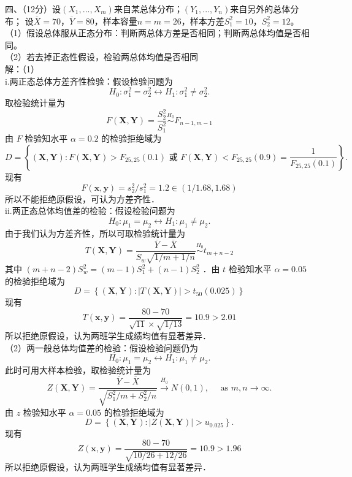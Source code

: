 \documentclass[UTF8,openany]{book}
\begin{document}
	\noindent 四、（12分）设$\left( X_1,...,X_m\right)$来自某总体分布；$\left( Y_1,...,Y_n\right)$来自另外的总体分布；
	设$\overline{X} = 70$，$\overline{Y} = 80$，样本容量$n = m = 26$，样本方差$S_1^2 = 10$，$S_2^2 = 12$。\\
	（1）假设总体服从正态分布：判断两总体方差是否相同；判断两总体均值是否相同。\\
	（2）若去掉正态性假设，检验两总体均值是否相同\\
	解：（1）\\
	i.两正态总体方差齐性检验：假设检验问题为
	$$
	H_0: \sigma_1^2=\sigma_2^2 \longleftrightarrow H_1: \sigma_1^2 \neq \sigma_2^2 .
	$$
	取检验统计量为
	$$
	F(\boldsymbol{X}, \boldsymbol{Y})=\frac{S_2^2}{S_1^2} \stackrel{H_0}{\sim} F_{n-1, m-1}
	$$
	由 $F$ 检验知水平 $\alpha=0.2$ 的检验拒绝域为
	$$
	D=\left\{(\boldsymbol{X}, \boldsymbol{Y}): F(\boldsymbol{X}, \boldsymbol{Y})>F_{25,25}(0.1) \text { 或 } F(\boldsymbol{X}, \boldsymbol{Y})<F_{25,25}(0.9)=\frac{1}{F_{25,25}(0.1)}\right\} \text {. }
	$$
	现有 
	$$F(\boldsymbol{x}, \boldsymbol{y})=s_2^2 / s_1^2=1.2 \in(1 / 1.68,1.68)$$
	所以不能拒绝原假设，可认为方差齐性．\\
	ii.两正态总体均值差的检验：假设检验问题为
	$$
	H_0: \mu_1=\mu_2 \longleftrightarrow H_1: \mu_1 \neq \mu_2 .
	$$
	由于我们认为方差齐性，所以可取检验统计量为
	$$
	T(\boldsymbol{X}, \boldsymbol{Y})=\frac{\overline{Y}-\overline{X}}{S_w \sqrt{1 / m+1 / n}} \stackrel{H_0}{\sim} t_{m+n-2}
	$$
	其中 $(m+n-2) S_w^2=(m-1) S_1^2+(n-1) S_2^2$ ．由 $t$ 检验知水平 $\alpha=0.05$ 的检验拒绝域为
	$$
	D=\left\{(\boldsymbol{X}, \boldsymbol{Y}):|T(\boldsymbol{X}, \boldsymbol{Y})|>t_{50}(0.025)\right\}
	$$
	现有 
	$$T(\boldsymbol{x}, \boldsymbol{y})=\frac{80-70}{\sqrt{11} \times \sqrt{1 / 13}}=10.9>2.01$$
	所以拒绝原假设，认为两班学生成绩均值有显著差异．\\
	（2）两一般总体均值差的检验：假设检验问题仍为
	$$
	H_0: \mu_1=\mu_2 \longleftrightarrow H_1: \mu_1 \neq \mu_2 .
	$$
	此时可用大样本检验，取检验统计量为
	$$
	Z(\boldsymbol{X}, \boldsymbol{Y})=\frac{\overline{Y}-\overline{X}}{\sqrt{S_1^2 / m+S_2^2 / n}} \xrightarrow{H_0} N(0,1), \quad \text { as } m, n \rightarrow \infty .
	$$
	由 $z$ 检验知水平 $\alpha=0.05$ 的检验拒绝域为
	$$
	D=\left\{(\boldsymbol{X}, \boldsymbol{Y}):|Z(\boldsymbol{X}, \boldsymbol{Y})|>u_{0.025}\right\} .
	$$
	现有 
	$$Z(\boldsymbol{x}, \boldsymbol{y})=\frac{80-70}{\sqrt{10 / 26+12 / 26}}=10.9>1.96$$
	所以拒绝原假设，认为两班学生成绩均值有显著差异．\\
	
	
	
\end{document}
